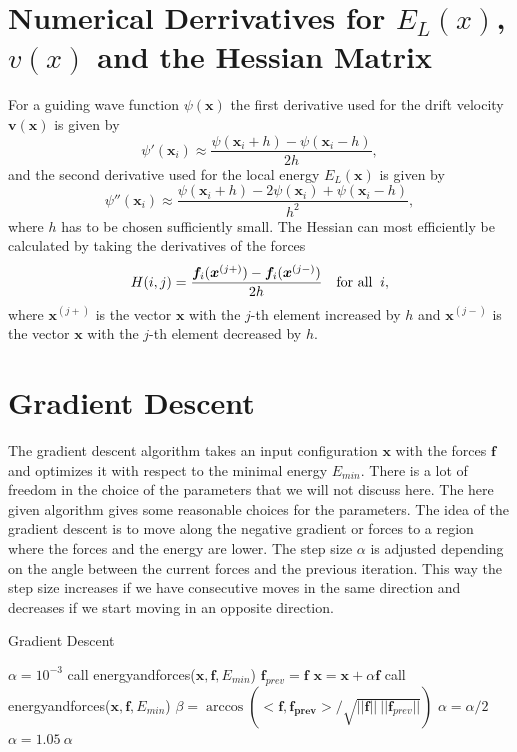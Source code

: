 \documentclass [12pt]{report}
\begin{document}
\begin{appendices}
\chapter{Numerical Derrivatives for $E_L(x)$, $v(x)$ and the Hessian Matrix} \label{appendixC}
For a guiding wave function $\psi(\bm{x})$ the first derivative used for the drift velocity $\bm{v}(\bm{x})$ is given by
\begin{equation}
\psi'(\bm{x}_i) \approx \frac{\psi(\bm{x}_i + h) - \psi(\bm{x}_i - h)}{2h},
\end{equation}
and the second derivative used for the local energy $E_L(\bm{x})$ is given by
\begin{equation}
\psi''(\bm{x}_i) \approx \frac{\psi(\bm{x}_i + h) - 2 \psi(\bm{x}_i) + \psi(\bm{x}_i - h)}{h^2},
\end{equation}
where $h$ has to be chosen sufficiently small.
The Hessian can most efficiently be calculated by taking the derivatives of the forces
\begin{equation}
H(i,j) = \frac{\bm{f}_i(\bm{x}^{(j+)}) - \bm{f}_i(\bm{x}^{(j-)})}{2h} \mbox{\quad for all \:} i,
\end{equation}
where $\bm{x}^{(j+)}$ is the vector $\bm{x}$ with the $j$-th element increased by $h$ and $\bm{x}^{(j-)}$ is the vector $\bm{x}$ with the $j$-th element decreased by $h$.
\chapter{Gradient Descent} \label{gradient_descent}
The gradient descent algorithm takes an input configuration $\bm{x}$ with the forces $\bm{f}$ and optimizes it with respect to the minimal energy $E_{min}$. There is a lot of freedom in the choice of the parameters that we will not discuss here. The here given algorithm gives some reasonable choices for the parameters. The idea of the gradient descent is to move along the negative gradient or forces to a region where the forces and the energy are lower. The step size $\alpha$ is adjusted depending on the angle between the current forces and the previous iteration. This way the step size increases if we have consecutive moves in the same direction and decreases if we start moving in an opposite direction. 
\begin{algorithm}
\caption{Gradient Descent}\label{grad_desc}
\begin{algorithmic}[1]
 
\State $\alpha = 10^{-3}$
\State call energyandforces($\bm{x}, \bm{f}, E_{min}$)
 
	\State $\bm{f}_{prev} = \bm{f}$	
	\State $\bm{x} = \bm{x} + \alpha \bm{f}$
	\State call energyandforces($\bm{x}, \bm{f}, E_{min}$)
	\State $\beta = \arccos{(<\bm{f},\bm{f_{prev}}>/\sqrt{||\bm{f}||\:||\bm{f}_{prev}||})}$ 
	 
		\State $\alpha = \alpha/2$
	\Else
		\State $\alpha = 1.05\ \alpha$
	\EndIf
\EndWhile
\EndProcedure
\end{algorithmic}
\end{algorithm}


\end{appendices}
\end{document}
